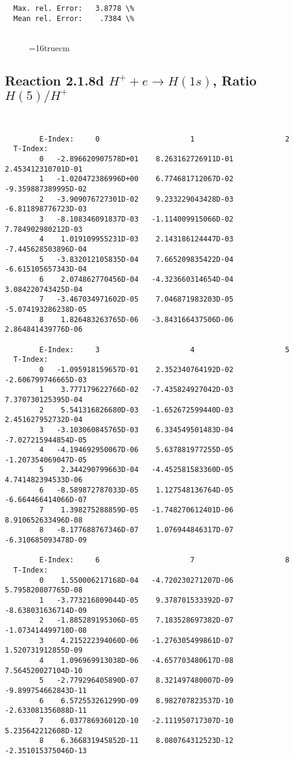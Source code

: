 \documentclass[12pt,dvipdfmx]{article}
\begin{document}
{\begin{small}
\begin{verbatim}
  Max. rel. Error:   3.8778 \%
  Mean rel. Error:    .7384 \%


\end{verbatim}\end{small}
\begin{figure} \label{2.1.8rc}
\epsfxsize=16truecm
\end{figure}
\newpage



\subsection{
Reaction 2.1.8d  $H^+ + e \rightarrow H(1s) $,  Ratio $H(5)/H^+$
}

\begin{small}\begin{verbatim}


        E-Index:     0                     1                     2
  T-Index:
        0   -2.896620907578D+01    8.263162726911D-01    2.453412310701D-01
        1   -1.020472386996D+00    6.774681712067D-02   -9.359887389995D-02
        2   -3.909076727301D-02    9.233229043428D-03   -6.811898776723D-03
        3   -8.108346091837D-03   -1.114009915066D-02    7.784902980212D-03
        4    1.019109955231D-03    2.143186124447D-03   -7.445628503896D-04
        5   -3.832012105835D-04    7.665209835422D-04   -6.615105657343D-04
        6    2.074862770456D-04   -4.323660314654D-04    3.084220743425D-04
        7   -3.467034971602D-05    7.046871983203D-05   -5.074193286238D-05
        8    1.826483263765D-06   -3.843166437506D-06    2.864841439776D-06

        E-Index:     3                     4                     5
  T-Index:
        0   -1.095918159657D-01    2.352340764192D-02   -2.606799746665D-03
        1    3.777179622766D-02   -7.435824927042D-03    7.370730125395D-04
        2    5.541316826680D-03   -1.652672599440D-03    2.451627952732D-04
        3   -3.103060845765D-03    6.334549501483D-04   -7.027215944854D-05
        4   -4.194692950067D-06    5.637881977255D-05   -1.207354069047D-05
        5    2.344290799663D-04   -4.452581583360D-05    4.741482394533D-06
        6   -8.589872787033D-05    1.127548136764D-05   -6.664466414066D-07
        7    1.398275288859D-05   -1.748270612401D-06    8.910652633496D-08
        8   -8.177688767346D-07    1.076944846317D-07   -6.310685093478D-09

        E-Index:     6                     7                     8
  T-Index:
        0    1.550006217168D-04   -4.720230271207D-06    5.795820807765D-08
        1   -3.773216809044D-05    9.378701533392D-07   -8.638031636714D-09
        2   -1.885289195306D-05    7.183528697382D-07   -1.073414499710D-08
        3    4.215222394060D-06   -1.276305499861D-07    1.520731912855D-09
        4    1.096969913038D-06   -4.657703480617D-08    7.564520027104D-10
        5   -2.779296405890D-07    8.321497480007D-09   -9.899754662843D-11
        6    6.572553261299D-09    8.982707823537D-10   -2.633081356088D-11
        7    6.037786936012D-10   -2.111950717307D-10    5.235642212608D-12
        8    6.366831945852D-11    8.080764312523D-12   -2.351015375046D-13


\end{verbatim}
\end{small}}
\end{document}
